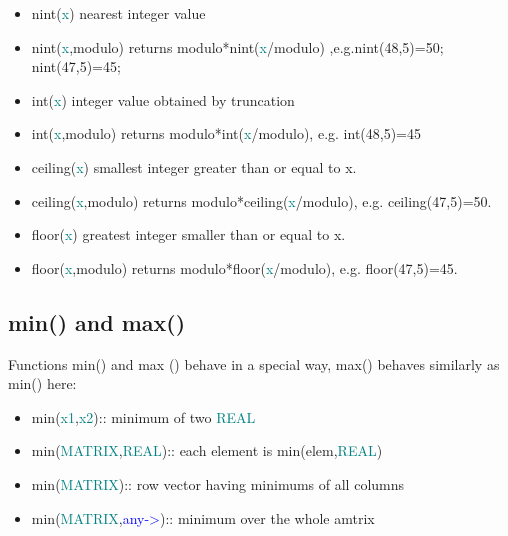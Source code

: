 {\begin{itemize}
\begin{itemize}
\begin{itemize} 
\item \textcolor{VioletRed}{nint}(\textcolor{teal}{x}) nearest integer value 
\item \textcolor{VioletRed}{nint}(\textcolor{teal}{x},modulo) returns modulo*\textcolor{VioletRed}{nint}(\textcolor{teal}{x}/modulo) ,e.g.\textcolor{VioletRed}{nint}(48,5)=50; \textcolor{VioletRed}{nint}(47,5)=45; 
\item \textcolor{VioletRed}{int}(\textcolor{teal}{x}) integer value obtained by truncation 
\item \textcolor{VioletRed}{int}(\textcolor{teal}{x},modulo) returns modulo*\textcolor{VioletRed}{int}(\textcolor{teal}{x}/modulo), e.g. \textcolor{VioletRed}{int}(48,5)=45 
\item \textcolor{VioletRed}{ceiling}(\textcolor{teal}{x}) smallest integer greater than or equal to {x}. 
\item \textcolor{VioletRed}{ceiling}(\textcolor{teal}{x},modulo) returns modulo*\textcolor{VioletRed}{ceiling}(\textcolor{teal}{x}/modulo), e.g. \textcolor{VioletRed}{ceiling}(47,5)=50. 
\item \textcolor{VioletRed}{floor}(\textcolor{teal}{x}) greatest integer smaller than or equal to {x}. 
\item \textcolor{VioletRed}{floor}(\textcolor{teal}{x},modulo) returns modulo*\textcolor{VioletRed}{floor}(\textcolor{teal}{x}/modulo), e.g. \textcolor{VioletRed}{floor}(47,5)=45. 
\end{itemize} 
\subsection{\textcolor{VioletRed}{min}() and \textcolor{VioletRed}{max}()} 
\label{minmax} 
Functions \textcolor{VioletRed}{min}() and max () 
behave in a special way, \textcolor{VioletRed}{max}() behaves similarly as \textcolor{VioletRed}{min}() here: 
\begin{itemize} 
\item \textcolor{VioletRed}{min}(\textcolor{teal}{x1},\textcolor{teal}{x2}):: minimum of two \textcolor{teal}{REAL} 
\item \textcolor{VioletRed}{min}(\textcolor{teal}{MATRIX},\textcolor{teal}{REAL}):: each element is \textcolor{VioletRed}{min}(elem,\textcolor{teal}{REAL}) 
\item \textcolor{VioletRed}{min}(\textcolor{teal}{MATRIX}):: row vector having minimums of all columns 
\item \textcolor{VioletRed}{min}(\textcolor{teal}{MATRIX},\textcolor{blue}{any->}):: minimum over the whole amtrix 
\end{itemize} 

\end{itemize}
\end{itemize}}
